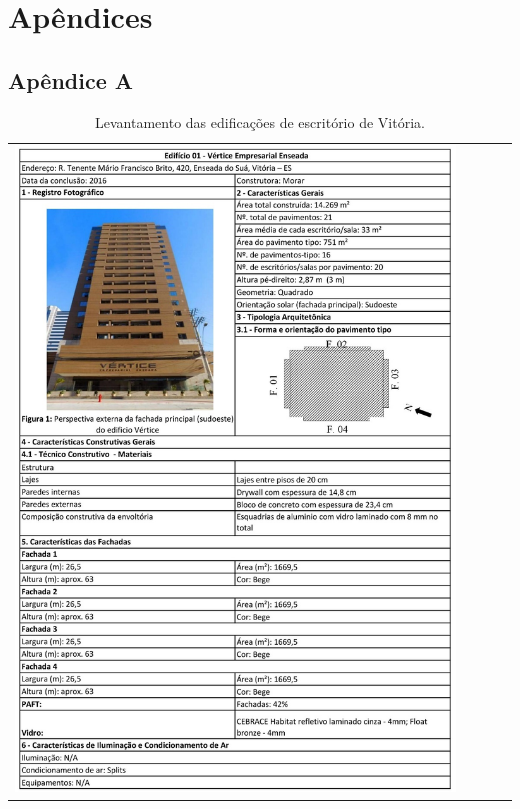 \section{Apêndices}
\subsection{Apêndice A}
\begin{table}[H]
    \centering
    \caption{Levantamento das edificações de escritório de Vitória.}
    \begin{tabular}{l}
        \includegraphics[width=0.9\textwidth]{figures/appendices/edificio01.png}
    \end{tabular}
    \label{tab:18}
\end{table}
\pagebreak
